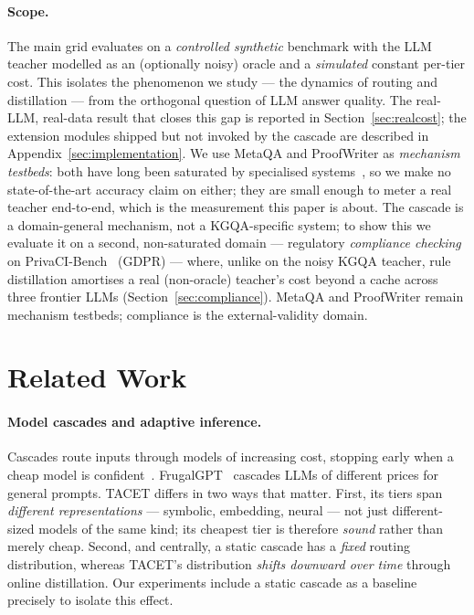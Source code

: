\documentclass[11pt]{article}
\theoremstyle{plain}
\begin{document}
\paragraph{Scope.} The main grid evaluates on a \emph{controlled synthetic}
benchmark with the LLM teacher modelled as an (optionally noisy) oracle and a
\emph{simulated} constant per-tier cost. This isolates the phenomenon we
study --- the dynamics of routing and distillation --- from the orthogonal
question of LLM answer quality. The real-LLM, real-data result that closes
this gap is reported in Section~\ref{sec:realcost}; the extension modules
shipped but not invoked by the cascade are described in
Appendix~\ref{sec:implementation}. We use MetaQA and ProofWriter as
\emph{mechanism testbeds}: both have long been saturated by specialised
systems~\citep{saxena2020embedkgqa,tafjord2021proofwriter}, so we make no
state-of-the-art accuracy claim on either; they are small enough to meter a
real teacher end-to-end, which is the measurement this paper is about.
The cascade is a domain-general mechanism, not a KGQA-specific system; to
show this we evaluate it on a second, non-saturated domain --- regulatory
\emph{compliance checking} on PrivaCI-Bench~\citep{privacibench2025} (GDPR) ---
where, unlike on the noisy KGQA teacher, rule distillation amortises a real
(non-oracle) teacher's cost beyond a cache across three frontier LLMs
(Section~\ref{sec:compliance}). MetaQA and ProofWriter remain mechanism
testbeds; compliance is the external-validity domain.

\section{Related Work}
\label{sec:related}

\paragraph{Model cascades and adaptive inference.} Cascades route inputs
through models of increasing cost, stopping early when a cheap model is
confident~\citep{viswanathan2019cascade}. FrugalGPT~\citep{chen2023frugalgpt}
cascades LLMs of different prices for general prompts. TACET differs in
two ways that matter. First, its tiers span \emph{different
representations} --- symbolic, embedding, neural --- not just different-sized
models of the same kind; its cheapest tier is therefore \emph{sound} rather
than merely cheap. Second, and centrally, a static cascade has a
\emph{fixed} routing distribution, whereas TACET's distribution
\emph{shifts downward over time} through online distillation. Our
experiments include a static cascade as a baseline precisely to isolate
this effect.
\end{document}
